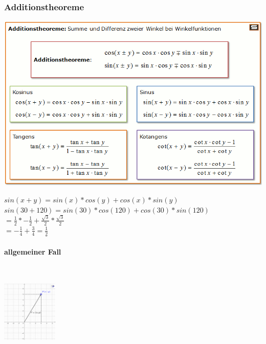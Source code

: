 \subsubsection{Additionstheoreme}
\begin{center}
    \includegraphics[width=1\textwidth]{Sem1/MINT/Bilder/Additionstheoreme_Trigonometrie.png}
\end{center}
$sin(x+y)=sin(x)*cos(y)+cos(x)*sin(y)$\\
$sin(30+120)=sin(30)*cos(120)+cos(30)*sin(120)$\\
$=\frac12*-\frac12+\frac{\sqrt3}{2}*\frac{\sqrt3}{2}$\\
$=-\frac14+\frac34=\underline{\frac12}$
\paragraph*{allgemeiner Fall}~\\
\begin{center}
    \includegraphics[width=100px]{Sem1/MINT/Bilder/download 1.png}
\end{center}
